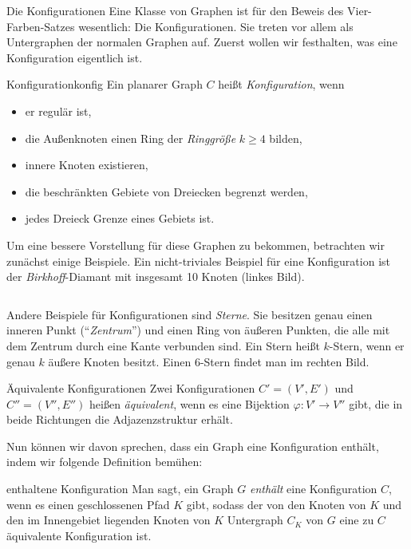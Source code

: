   \begin{section}{Die Konfigurationen}
   Eine Klasse von Graphen ist für den Beweis des Vier-Farben-Satzes wesentlich: Die Konfigurationen. Sie treten vor allem als Untergraphen der normalen Graphen auf. Zuerst wollen wir festhalten, was eine Konfiguration eigentlich ist.
   
   \begin{definitionl}{Konfiguration}{konfig}
    Ein planarer Graph $C$ heißt \textit{Konfiguration}, wenn
    \begin{itemize}
     \item er regulär ist,
     \item die Außenknoten einen Ring der \textit{Ringgröße} $k \geq 4$ bilden,
     \item innere Knoten existieren,
     \item die beschränkten Gebiete von Dreiecken begrenzt werden,
     \item jedes Dreieck Grenze eines Gebiets ist.
    \end{itemize}
   \end{definitionl}
   
  Um eine bessere Vorstellung für diese Graphen zu bekommen, betrachten wir zunächst einige Beispiele. Ein nicht-triviales Beispiel für eine Konfiguration ist der \textit{Birkhoff}-Diamant mit insgesamt 10 Knoten (linkes Bild).
   
  \[     \]
   
  Andere Beispiele für Konfigurationen sind \textit{Sterne}. Sie besitzen genau einen inneren Punkt (``\textit{Zentrum}'') und einen Ring von äußeren Punkten, die alle mit dem Zentrum durch eine Kante verbunden sind. Ein Stern heißt $k$-Stern, wenn er genau $k$ äußere Knoten besitzt. Einen $6$-Stern findet man im rechten Bild.
  
  \begin{definition}{Äquivalente Konfigurationen}
   Zwei Konfigurationen $C'=(V',E')$ und $C''=(V'',E'')$ heißen \textit{äquivalent}, wenn es eine Bijektion $\varphi : V' \rightarrow V''$ gibt, die in beide Richtungen die Adjazenzstruktur erhält.
  \end{definition}
  
  Nun können wir davon sprechen, dass ein Graph eine Konfiguration enthält, indem wir folgende Definition bemühen:
  
  \begin{definition}{enthaltene Konfiguration}
   Man sagt, ein Graph $G$ \textit{enthält} eine Konfiguration $C$, wenn es einen geschlossenen Pfad $K$ gibt, sodass der von den Knoten von $K$ und den im Innengebiet liegenden Knoten von $K$ Untergraph $C_K$ von $G$ eine zu $C$ äquivalente Konfiguration ist.
  \end{definition}


  \end{section}
\newpage